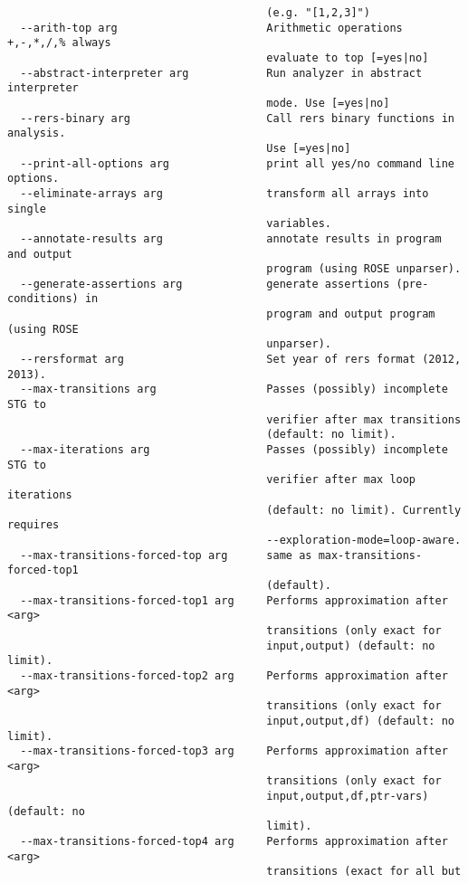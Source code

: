 \documentclass[natbib]{article}
\begin{document}
\begin{verbatim}
                                        (e.g. "[1,2,3]")
  --arith-top arg                       Arithmetic operations +,-,*,/,% always 
                                        evaluate to top [=yes|no]
  --abstract-interpreter arg            Run analyzer in abstract interpreter 
                                        mode. Use [=yes|no]
  --rers-binary arg                     Call rers binary functions in analysis.
                                        Use [=yes|no]
  --print-all-options arg               print all yes/no command line options.
  --eliminate-arrays arg                transform all arrays into single 
                                        variables.
  --annotate-results arg                annotate results in program and output 
                                        program (using ROSE unparser).
  --generate-assertions arg             generate assertions (pre-conditions) in
                                        program and output program (using ROSE 
                                        unparser).
  --rersformat arg                      Set year of rers format (2012, 2013).
  --max-transitions arg                 Passes (possibly) incomplete STG to 
                                        verifier after max transitions 
                                        (default: no limit).
  --max-iterations arg                  Passes (possibly) incomplete STG to 
                                        verifier after max loop iterations 
                                        (default: no limit). Currently requires
                                        --exploration-mode=loop-aware.
  --max-transitions-forced-top arg      same as max-transitions-forced-top1 
                                        (default).
  --max-transitions-forced-top1 arg     Performs approximation after <arg> 
                                        transitions (only exact for 
                                        input,output) (default: no limit).
  --max-transitions-forced-top2 arg     Performs approximation after <arg> 
                                        transitions (only exact for 
                                        input,output,df) (default: no limit).
  --max-transitions-forced-top3 arg     Performs approximation after <arg> 
                                        transitions (only exact for 
                                        input,output,df,ptr-vars) (default: no 
                                        limit).
  --max-transitions-forced-top4 arg     Performs approximation after <arg> 
                                        transitions (exact for all but 

\end{verbatim}
\end{document}
